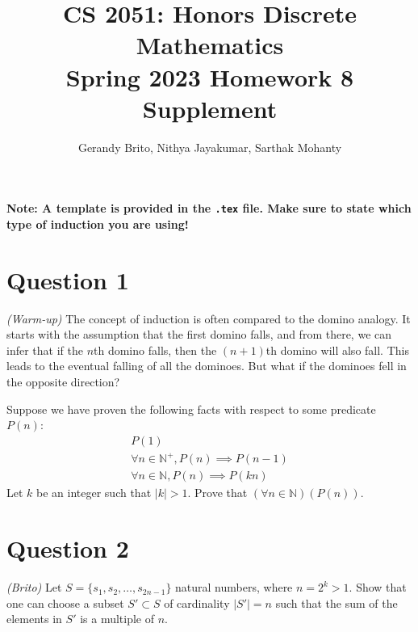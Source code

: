 \documentclass{article}
\title{\vspace{-1cm}CS 2051: Honors Discrete Mathematics \\Spring 2023 Homework 8 Supplement}
\author{Gerandy Brito, Nithya Jayakumar, Sarthak Mohanty}
\date{}
\begin{document}
\maketitle

\textbf{Note: A template is provided in the \texttt{.tex} file. Make sure to state which type of induction you are using!}

\section*{Question 1}
    \textit{(Warm-up)} The concept of induction is often compared to the domino analogy. It starts with the assumption that the first domino falls, and from there, we can infer that if the $n$th domino falls, then the $(n + 1)$th domino will also fall. This leads to the eventual falling of all the dominoes. But what if the dominoes fell in the opposite direction? 
    
    \vspace{2mm}
    Suppose we have proven the following facts with respect to some predicate $P(n)$:
    \begin{gather}
        P(1) \\
        \forall n \in \mathbb{N}^{+}, P(n) \implies P(n - 1) \\
        \forall n \in \mathbb{N}, P(n) \implies P(kn)
    \end{gather}
    Let $k$ be an integer such that $|k| > 1$. Prove that $(\forall n \in \mathbb{N})(P(n))$.

\section*{Question 2 }
    \textit{(Brito)} Let $S=\{s_1,s_2,\ldots, s_{2n-1}\}$ natural numbers, where $n=2^k>1$. Show that one can choose a subset $S'\subset S$ of cardinality $|S'|=n$ such that the sum of the elements in $S'$ is a multiple of $n$.




\end{document}
